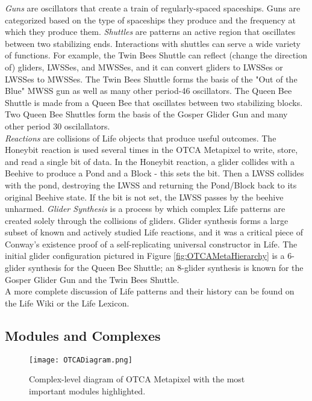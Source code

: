 {\textit{Guns} are oscillators that create a train of regularly-spaced spaceships.  Guns are categorized based on the type of spaceships they produce and the frequency at which they produce them.  \textit{Shuttles} are patterns an active region that oscillates between two stabilizing ends.  Interactions with shuttles can serve a wide variety of functions.  For example, the Twin Bees Shuttle can reflect (change the direction of) gliders, LWSSes, and MWSSes, and it can convert gliders to LWSSes or LWSSes to MWSSes.  The Twin Bees Shuttle forms the basis of the "Out of the Blue" MWSS gun as well as many other period-46 oscillators.  The Queen Bee Shuttle  is made from a Queen Bee that oscillates between two stabilizing blocks.  Two Queen Bee Shuttles form the basis of the Gosper Glider Gun and many other period 30 oscilallators.\\

\textit{Reactions} are collisions of Life objects that produce useful outcomes.  The Honeybit reaction is used several times in the OTCA Metapixel to write, store, and read a single bit of data.  In the Honeybit reaction, a glider collides with a Beehive to produce a Pond and a Block - this sets the bit.  Then a LWSS collides with the pond, destroying the LWSS and returning the Pond/Block back to its original Beehive state.  If the bit is not set, the LWSS passes by the beehive unharmed.  \textit{Glider Synthesis} is a process by which complex Life patterns are created solely through the collisions of gliders.  Glider synthesis forms a large subset of known and actively studied Life reactions, and it was a critical piece of Conway's existence proof of a self-replicating universal constructor in Life.  The initial glider configuration pictured in Figure \ref{fig:OTCAMetaHierarchy} is a 6-glider synthesis for the Queen Bee Shuttle; an 8-glider synthesis is known for the Gosper Glider Gun and the Twin Bees Shuttle.\\

A more complete discussion of Life patterns and their history can be found on the Life Wiki\cite{Authors2016} or the Life Lexicon\cite{Silver2016}.

\subsection{Modules and Complexes}

\begin{figure}
  \texttt{[image: OTCADiagram.png]}
  \caption{Complex-level diagram of OTCA Metapixel with the most important modules highlighted.}
  \label{fig:OTCADiagram}
\end{figure}

}
